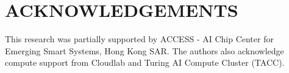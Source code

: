 \documentclass[onecolumn]{IEEEtran}
\begin{document}
\section*{ACKNOWLEDGEMENTS}
This research was partially supported by ACCESS - AI Chip Center for Emerging Smart Systems, Hong Kong SAR. The authors also acknowledge compute support from Cloudlab \cite{Duplyakin2019} and Turing AI Compute Cluster (TACC).




\end{document}
